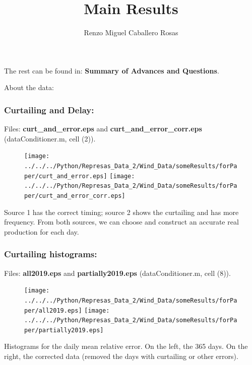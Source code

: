 \documentclass[aspectratio=169]{beamer}\usepackage[utf8]{inputenc}
\title{Main Results}
\subtitle{Renzo Miguel Caballero Rosas}
\begin{document}
\begin{frame}
\titlepage
The rest can be found in: \textbf{Summary of Advances and Questions}.
\end{frame}


\begin{frame}

{\Huge About the data:}

\end{frame}


\begin{frame}\frametitle{Curtailing and Delay:}
Files: \textbf{curt\_and\_error.eps} and \textbf{curt\_and\_error\_corr.eps} (dataConditioner.m, cell (2)).
\begin{figure}[ht!]
\centering
\texttt{[image: ../../../Python/Represas\_Data\_2/Wind\_Data/someResults/forPaper/curt\_and\_error.eps]}\quad\quad
\texttt{[image: ../../../Python/Represas\_Data\_2/Wind\_Data/someResults/forPaper/curt\_and\_error\_corr.eps]}
\end{figure}

Source 1 has the correct timing; source 2 shows the curtailing and has more frequency. From both sources, we can choose and construct an accurate real production for each day.

\end{frame}


\begin{frame}\frametitle{Curtailing histograms:}
Files: \textbf{all2019.eps} and \textbf{partially2019.eps} (dataConditioner.m, cell (8)).
\begin{figure}[ht!]
\centering
\texttt{[image: ../../../Python/Represas\_Data\_2/Wind\_Data/someResults/forPaper/all2019.eps]}\quad\quad
\texttt{[image: ../../../Python/Represas\_Data\_2/Wind\_Data/someResults/forPaper/partially2019.eps]}
\end{figure}

Histograms for the daily mean relative error. On the left, the 365 days. On the right, the corrected data (removed the days with curtailing or other errors).

\end{frame}
\end{document}
